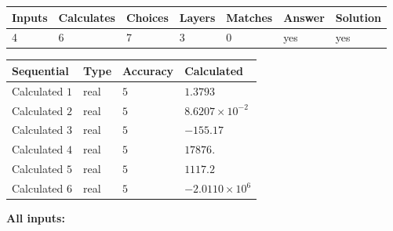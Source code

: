 \documentclass[12pt]{article}
\begin{document}
 
 
\noindent{}
 
 

 
\vspace{0.3in}
   
   
   
   
\noindent\begin{tabular}{|l|l|l|l|l|l|l|}
 \hline
Inputs & Calculates & Choices & Layers & Matches & Answer & Solution \\ \hline
           4 & 
           6 & 
           7
  & 
           3 & 
           0 & 
  yes & 
  yes 
  \\ \hline
 \end{tabular}
   
   
   
   
\noindent{}
   
   
  
  
\noindent\begin{tabular}{|l|l|l|l|}
\hline
 Sequential & Type & Accuracy & Calculated \\ 
\hline
 
 
  Calculated $           1$ & real & $           5 $ & 
 $ 1.3793 $ 
 \\  \hline  
 
 
  Calculated $           2$ & real & $           5 $ & 
 $ 8.6207 \times 10^{-2} $ 
 \\  \hline  
 
 
  Calculated $           3$ & real & $           5 $ & 
 $ -155.17 $ 
 \\  \hline  
 
 
  Calculated $           4$ & real & $           5 $ & 
 $ 17876. $ 
 \\  \hline  
 
 
  Calculated $           5$ & real & $           5 $ & 
 $ 1117.2 $ 
 \\  \hline  
 
 
  Calculated $           6$ & real & $           5 $ & 
 $ -2.0110 \times 10^{6} $ 
 \\  \hline  
 \end{tabular}
   
   
   
   
\noindent\vspace{0.1in}\hspace{-0.08in} {\textbf{\Large{All inputs: }}}
   
\end{document}

